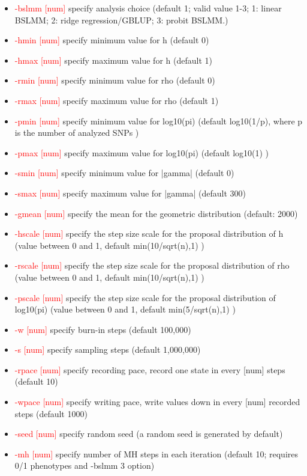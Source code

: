 \documentclass[11pt]{article}
\begin{document}
\begin{itemize}
\item  \textcolor{red}{-bslmm       [num]}     \quad          specify analysis choice (default 1; valid value 1-3; 1: linear BSLMM; 2: ridge regression/GBLUP; 3: probit BSLMM.)
\item  \textcolor{red}{-hmin     [num] }     \quad  specify minimum value for h (default 0)
\item  \textcolor{red}{-hmax     [num]}     \quad  specify maximum value for h (default 1)
\item  \textcolor{red}{-rmin     [num]}     \quad  specify minimum value for rho (default 0)
\item  \textcolor{red}{-rmax     [num]}     \quad  specify maximum value for rho (default 1)
\item  \textcolor{red}{-pmin     [num]}     \quad  specify minimum value for log10(pi) (default log10(1/p), where p is the number of analyzed SNPs )
\item  \textcolor{red}{-pmax     [num]}     \quad  specify maximum value for log10(pi) (default log10(1) )
\item  \textcolor{red}{-smin     [num]}     \quad  specify minimum value for |gamma| (default 0)
\item  \textcolor{red}{-smax     [num]}     \quad  specify maximum value for |gamma| (default 300)
\item  \textcolor{red}{-gmean    [num]}     \quad specify the mean for the geometric distribution (default: 2000)
\item  \textcolor{red}{ -hscale   [num]}     \quad  specify the step size scale for the proposal distribution of h (value between 0 and 1, default min(10/sqrt(n),1) )
\item  \textcolor{red}{-rscale   [num]}     \quad  specify the step size scale for the proposal distribution of rho (value between 0 and 1, default min(10/sqrt(n),1) )
\item  \textcolor{red}{-pscale   [num] }     \quad  specify the step size scale for the proposal distribution of log10(pi) (value between 0 and 1, default min(5/sqrt(n),1) )
\item  \textcolor{red}{-w        [num]}     \quad specify burn-in steps (default 100,000)
\item  \textcolor{red}{-s        [num] }     \quad  specify sampling steps (default 1,000,000)
\item  \textcolor{red}{-rpace    [num]}     \quad  specify recording pace, record one state in every [num] steps (default 10)
\item  \textcolor{red}{-wpace    [num]}     \quad  specify writing pace, write values down in every [num] recorded steps (default 1000)
\item  \textcolor{red}{-seed     [num] }     \quad  specify random seed (a random seed is generated by default)
\item  \textcolor{red}{-mh       [num]}     \quad  specify number of MH steps in each iteration (default 10; requires 0/1 phenotypes and -bslmm 3 option)
\end{itemize}
\end{document}
